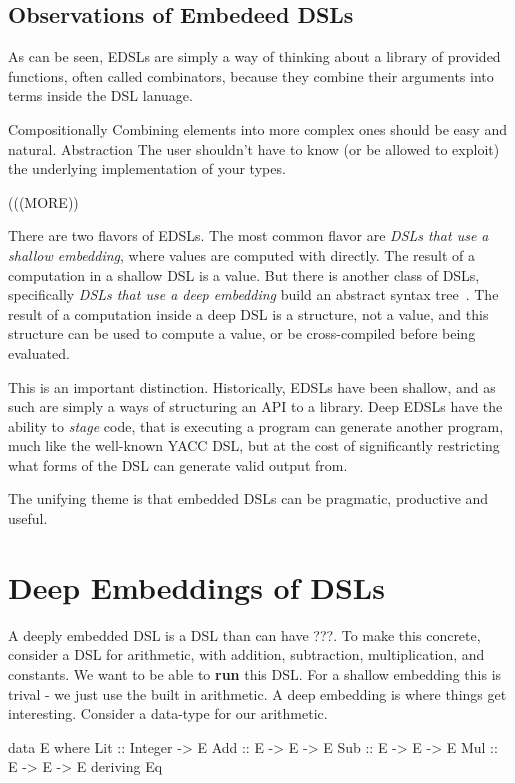 \documentclass[11pt]{article}
\begin{document}
\subsection{Observations of Embedeed DSLs}

As can be seen, EDSLs are simply a way of thinking about a library
of provided functions, often called combinators, because they combine
their arguments into terms inside the DSL lanuage.

Compositionally
Combining elements into more complex ones should be easy and natural.
Abstraction
The user shouldn’t have to know (or be allowed to exploit) the underlying implementation of your types.

(((MORE))

There are two flavors of EDSLs.
The most common flavor are
{\em DSLs that use a shallow embedding\/}, where values are computed with directly.
The result of a computation in a shallow DSL is a value.
But there is another class of DSLs, 
specifically {\em DSLs that use a deep embedding\/} build an abstract syntax tree~\cite{Elliott:03:CompileDSEL-JFP}.
The result of a computation inside a deep DSL
is a structure, not a value, and this structure can be used to compute a value,
or be cross-compiled before being evaluated.

This is an important distinction. Historically, EDSLs have been shallow,
and as such are simply a ways of structuring an API to a library. Deep EDSLs
have the ability to {\em stage\/} code, that is executing a program
can generate another program, much like the well-known YACC DSL,
but at the cost of significantly restricting what forms of the DSL can
generate valid output from.

The unifying theme is that embedded DSLs can
be pragmatic, productive and useful. 

\section{Deep Embeddings of DSLs}

A deeply embedded DSL is a DSL than can have ???.
To make this concrete, consider a DSL for arithmetic,
with addition, subtraction, multiplication, and constants.
We want to be able to {\bf run\/} this DSL. For a shallow
embedding this is trival - we just use the built in 
arithmetic. A deep embedding is where things get
interesting. Consider a data-type for our arithmetic.

\begin{Code}
data E where
 Lit :: Integer  -> E
 Add :: E -> E -> E
 Sub :: E -> E -> E
 Mul :: E -> E -> E
 deriving Eq
\end{Code}
\end{document}
